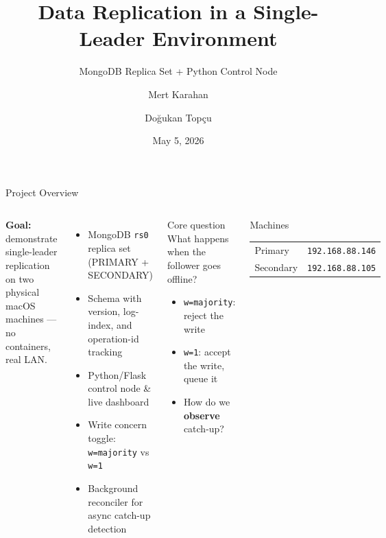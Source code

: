 \documentclass[aspectratio=169]{beamer}
\title[CENG465]{Data Replication in a Single-Leader Environment}
\subtitle{MongoDB Replica Set + Python Control Node}
\author{Mert Karahan \and Do\u{g}ukan Top\c{c}u}
\institute{CENG465 --- Principles of Data-Intensive Systems}
\date{May 5, 2026}
\begin{document}
\begin{frame}
  \titlepage
\end{frame}

\begin{frame}{Project Overview}
  \begin{columns}
      \small\textbf{Goal:} demonstrate single-leader replication on two physical macOS machines — no containers, real LAN.
      \begin{itemize}\small
        \item MongoDB \texttt{rs0} replica set (PRIMARY + SECONDARY)
        \item Schema with version, log-index, and operation-id tracking
        \item Python/Flask control node \& live dashboard
        \item Write concern toggle: \texttt{w=majority} vs \texttt{w=1}
        \item Background reconciler for async catch-up detection
      \end{itemize}
      \begin{block}{Core question}
        \small What happens when the follower goes offline?
        \begin{itemize}\small
          \item \texttt{w=majority}: reject the write
          \item \texttt{w=1}: accept the write, queue it
          \item How do we \textbf{observe} catch-up?
        \end{itemize}
      \end{block}
      \begin{block}{Machines}
        \small
        \begin{tabular}{ll}
          Primary   & \texttt{192.168.88.146} \\
          Secondary & \texttt{192.168.88.105} \\
        \end{tabular}
      \end{block}
  \end{columns}
\end{frame}
\end{document}
